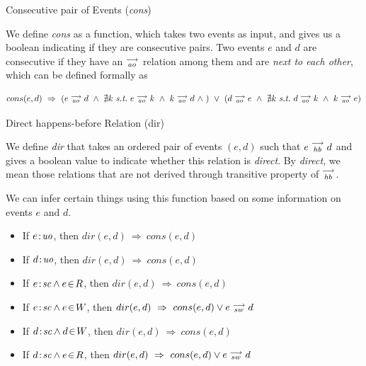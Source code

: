     \begin{definition}{Consecutive pair of Events (\emph{cons})}
        
        We define \emph{cons} as a function, which takes two events as input, and gives us a boolean indicating if they are consecutive pairs. Two events $e$ and $d$ are consecutive if they have an $\stackrel{\longrightarrow}{_{ao}}$ relation among them and are \emph{next to each other}, which can be defined formally as 
        
        \[
            cons(e,d) \ \Rightarrow \ 
            (
                e \stck{_{ao}} d  \ \wedge \ 
                \nexists k \ \textit{s.t.} \ 
                e \stck{_{ao}} k  \ \wedge \
                k \stck{_{ao}} d  \ \wedge \
            )
            \ \vee \
            (
                d \stck{_{ao}} e  \ \wedge \ 
                \nexists k \ \textit{s.t.} \ 
                d \stck{_{ao}} k  \ \wedge \
                k \stck{_{ao}} e  
            )
        \]
        
        
    \end{definition}

\begin{definition}{Direct happens-before Relation (dir)}
    
    We define \textit{dir} that takes an ordered pair of events $(e,d)$ such that $e\stackrel{\longrightarrow}{_{hb}}d$ and gives a boolean value to indicate whether this relation is \textit{direct}. By \textit{direct}, we mean those relations that are not derived through transitive property of $\stackrel{\longrightarrow}{_{hb}}$.
    
    We can infer certain things using this function based on some information on events $e$ and $d$. 
    \begin{itemize}
        \item If $e\!:\!\textit{uo}$, then $dir(e,d) \ \Rightarrow \ cons(e,d)$
        \item If $d\!:\!\textit{uo}$, then $dir(e,d) \ \Rightarrow \ cons(e,d)$
        \item If $e\!:\!\textit{sc} \wedge e\!\in\!R$, then $dir(e,d) \ \Rightarrow \ cons(e,d)$
        \item If $e\!:\!\textit{sc} \wedge e\!\in\!W$, then $dir(e,d) \ \Rightarrow \ cons(e,d) \vee \reln{e}{sw}{d}$
        \item If $d\!:\!\textit{sc} \wedge d\!\in\!W$, then $dir(e,d) \ \Rightarrow \ cons(e,d)$
        \item If $d\!:\!\textit{sc} \wedge e\!\in\!R$, then $dir(e,d) \ \Rightarrow \ cons(e,d) \vee \reln{e}{sw}{d}$
    \end{itemize}


\end{definition}


